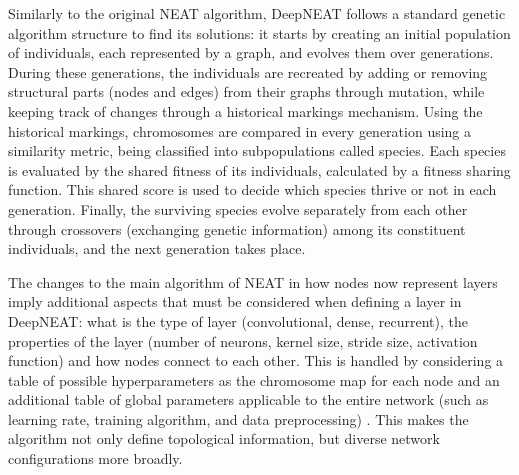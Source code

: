 \documentclass[12pt]{article}
\begin{document}
    \begin{comment}
     As described in the original work \cite{DBLP:journals/corr/MiikkulainenLMR17}, "[DeepNEAT] follows the same fundamental process as NEAT: First, a population of chromosomes (each represented by a graph) with minimal complexity is created. Over generations, structure (i.e. nodes and edges) is added to the graph incrementally through mutation. During crossover, historical markings are used to determine how genes of two chromosomes can be lined up. The population is divided into species (i.e. subpopulations) based on a similarity metric. Each species grows proportionally to its fitness and evolution occurs separately in each species". 
    \end{comment}
Similarly to the original NEAT algorithm, DeepNEAT follows a standard genetic algorithm structure to find its solutions: it starts by creating an initial population of individuals, each represented by a graph, and evolves them over generations. During these generations, the individuals are recreated by adding or removing structural parts (nodes and edges) from their graphs through mutation, while keeping track of changes through a historical markings mechanism. Using the historical markings, chromosomes are compared in every generation using a similarity metric, being classified into subpopulations called species. Each species is evaluated by the shared fitness of its individuals, calculated by a fitness sharing function. This shared score is used to decide which species thrive or not in each generation. Finally, the surviving species evolve separately from each other through crossovers (exchanging genetic information) among its constituent individuals, and the next generation takes place.

The changes to the main algorithm of NEAT in how nodes now represent layers imply additional aspects that must be considered when defining a layer in DeepNEAT: what is the type of layer (convolutional, dense, recurrent), the properties of the layer (number of neurons, kernel size, stride size, activation function) and how nodes connect to each other. This is handled by considering a table of possible hyperparameters as the chromosome map for each node and an additional table of global parameters applicable to the entire network (such as learning rate, training algorithm, and data preprocessing) \cite{DBLP:journals/corr/MiikkulainenLMR17}. This makes the algorithm not only define topological information, but diverse network configurations more broadly.
\end{document}
